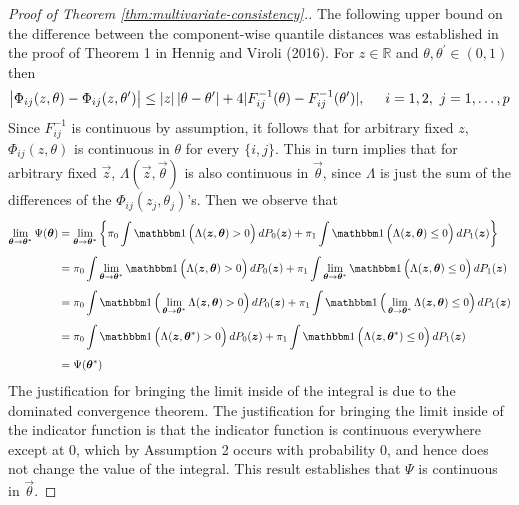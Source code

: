 \begin{proof}[Proof of Theorem \ref{thm:multivariate-consistency}.]
  The following upper bound on the difference between the component-wise
  quantile distances was established in the proof of Theorem 1 in Hennig and
  Viroli (2016).  For $z \in \mathbb{R}$ and
  $\theta, \theta^{\prime} \in (0, 1)$ then
  \begin{equation}
    \label{eq:quantile-distance-ubnd}
    \big| \Phi_{ij}(z, \theta) - \Phi_{ij}(z, \theta^{\prime}) \big|
    \leq |z|\, | \theta - \theta^{\prime} | +
    4 | F_{ij}^{-1}(\theta) - F_{ij}^{-1}(\theta^{\prime}) |,
    \hspace{5mm} i = 1, 2,~ j = 1, \dots, p
  \end{equation}
  Since $F_{ij}^{-1}$ is continuous by assumption, it follows that for arbitrary
  fixed $z$, $\Phi_{ij}(z, \theta)$ is continuous in $\theta$ for every
  $\{i, j\}$.  This in turn implies that for arbitrary fixed $\vec{z}$,
  $\Lambda(\vec{z}, \vec{\theta})$ is also continuous in $\vec{\theta}$, since
  $\Lambda$ is just the sum of the differences of the
  $\Phi_{ij}(z_j, \theta_j)$'s.  Then we observe that
  \begin{align}
    \label{eq:multivariate-phi-continuity}
    \begin{split}
      \limtheta \Psi(\vec{\theta})
      & = \limtheta \left\{
        \pi_0 \int \ind\Big( \Lambda(\vec{z}, \vec{\theta}) > 0 \Big)\, dP_0(\vec{z}) +
        \pi_1 \int \ind\Big(\Lambda(\vec{z}, \vec{\theta}) \leq 0 \Big)\, dP_1(\vec{z})
      \right\} \\[1ex]
      & = \pi_0 \int \limtheta \ind\Big( \Lambda(\vec{z}, \vec{\theta}) > 0 \Big)\, dP_0(\vec{z})
      + \pi_1 \int \limtheta \ind\Big(\Lambda(\vec{z}, \vec{\theta}) \leq 0 \Big)\, dP_1(\vec{z})
      \\[1ex]
      & = \pi_0 \int \ind \Big( \limtheta \Lambda(\vec{z}, \vec{\theta}) > 0 \Big)\, dP_0(\vec{z})
      + \pi_1 \int \ind \Big( \limtheta \Lambda(\vec{z}, \vec{\theta}) \leq 0 \Big)\, dP_1(\vec{z})
      \\[1ex]
      & = \pi_0 \int \ind \Big( \Lambda(\vec{z}, \vec{\theta}^{*}) > 0 \Big)\, dP_0(\vec{z})
      + \pi_1 \int \ind \Big( \Lambda(\vec{z}, \vec{\theta}^{*}) \leq 0 \Big)\, dP_1(\vec{z})
      \\[1ex]
      & = \Psi(\vec{\theta}^{*})
    \end{split}
  \end{align}
  The justification for bringing the limit inside of the integral is due to the
  dominated convergence theorem.  The justification for bringing the limit
  inside of the indicator function is that the indicator function is continuous
  everywhere except at 0, which by Assumption 2 occurs with probability 0, and
  hence does not change the value of the integral.  This result establishes that
  $\Psi$ is continuous in $\vec{\theta}$.


\end{proof}
